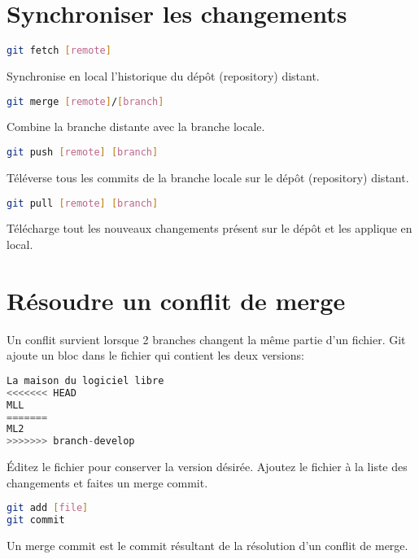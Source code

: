 \documentclass[10pt,landscape]{article}
\begin{document}
\begin{multicols*}{3}
\section{Synchroniser les changements}
\begin{lstlisting}[language=bash]
git fetch [remote]
\end{lstlisting}
Synchronise en local l'historique du dépôt (repository) distant.
\begin{lstlisting}[language=bash]
git merge [remote]/[branch]
\end{lstlisting}
Combine la branche distante avec la branche locale.
\begin{lstlisting}[language=bash]
git push [remote] [branch]
\end{lstlisting}
Téléverse tous les commits de la branche locale sur le dépôt (repository) distant.
\begin{lstlisting}[language=bash]
git pull [remote] [branch]
\end{lstlisting}
Télécharge tout les nouveaux changements présent sur le dépôt et les applique en local.

\newpage
\section{Résoudre un conflit de merge}
Un conflit survient lorsque 2 branches changent la même partie d'un fichier. Git
ajoute un bloc dans le fichier qui contient les deux versions:
\begin{lstlisting}[language=c]
La maison du logiciel libre
<<<<<<< HEAD
MLL
=======
ML2
>>>>>>> branch-develop
\end{lstlisting}
Éditez le fichier pour conserver la version désirée. Ajoutez le fichier à la
liste des changements et faites un merge commit.
\begin{lstlisting}[language=bash]
git add [file]
git commit
\end{lstlisting}
Un merge commit est le commit résultant de la résolution d'un conflit de merge.
\vfill
\vspace{1em}
\end{multicols*}
\end{document}
